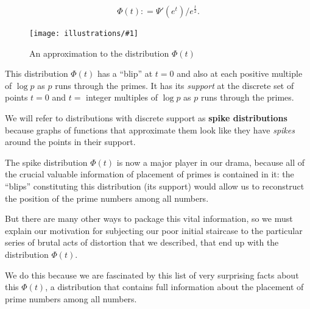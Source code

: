 \documentclass[11pt]{article}
\newcommand{\ill}[3]{ 
   \begin{figure}[H]
   \begin{center}
   \texttt{[image: illustrations/\#1]}
   \caption{#3}
   \end{center}
    \end{figure}
}
\theoremstyle{plain}
\theoremstyle{definition}
\numberwithin{equation}{section}
\numberwithin{figure}{section}
\numberwithin{table}{section}
\begin{document}
$$
  \Phi(t) : = \Psi'(e^t)/e^{\frac{t}{2}}.
$$

  
\bigskip
   
   
\ill{phi_50}{0.6}{An approximation to the distribution $\Phi(t)$}
     
\bigskip


This distribution $\Phi(t)$ has a ``blip'' at $t=0$ and also at each
positive multiple of $\log p$ as $p$ runs through the primes.  It has
its {\em support} at the discrete set of points $t=0$ and $t=$
integer multiples of $\log p$ as $p$ runs through the primes.


We will refer to distributions with discrete support as {\bf spike
  distributions} because graphs of functions that approximate them
look like they have {\em spikes} around the points in their support.

The spike distribution $\Phi(t)$ is now a major player in our drama,
because all of the crucial valuable information of placement of primes
is contained in it: the ``blips'' constituting this distribution (its
support) would allow us to reconstruct the position of the prime
numbers among all numbers.

But there are many other ways to package this vital information, so we
must explain our motivation for subjecting our poor initial staircase
to the particular series of brutal acts of distortion that we
described, that end up with the distribution $\Phi(t)$.

We do this because we are fascinated by this list of very surprising
facts about this $\Phi(t)$, a distribution that contains full
information about the placement of prime numbers among all numbers.
\end{document}

